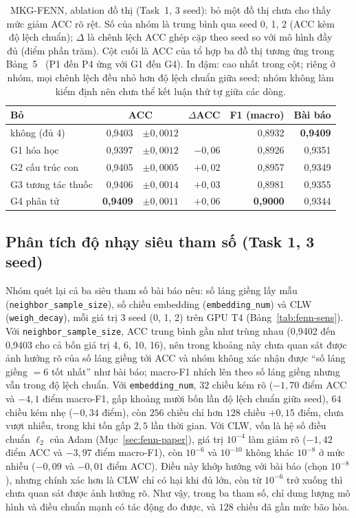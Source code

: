 \documentclass[conference]{IEEEtran}
\newcommand{\hlg}[1]{{\sethlcolor{hlgreen}\hl{#1}}}
\renewcommand{\hl}[1]{#1}
\begin{document}
\begin{table}[t]
\caption{MKG-FENN, ablation đồ thị (Task~1, 3 seed): bỏ một đồ thị \hlg{chưa cho thấy mức giảm ACC rõ rệt}. Số của nhóm là
trung bình qua seed 0, 1, 2 (ACC kèm độ lệch chuẩn); $\Delta$ là chênh lệch ACC ghép cặp theo seed so với
mô hình đầy đủ (điểm phần trăm). Cột cuối là ACC của tổ hợp ba đồ thị tương ứng trong
Bảng~5~\cite{mkgfenn} (P1 đến P4 ứng với G1 đến G4). In đậm: cao nhất trong cột; riêng ở nhóm, mọi chênh lệch
đều nhỏ hơn độ lệch chuẩn giữa seed\hlg{; nhóm không làm kiểm định nên chưa thể kết luận thứ tự giữa các dòng.}}
\label{tab:fenn-abl}
\centering\footnotesize
\setlength{\tabcolsep}{2.3pt}
\begin{tabular}{lr@{\,}lrrr}
\toprule
Bỏ & \multicolumn{2}{c}{ACC} & $\Delta$ACC & F1 (macro) & Bài báo \\
\midrule
không (đủ 4) & 0,9403 & ${\pm}0{,}0012$ & & 0,8932 & \textbf{0,9409} \\
\addlinespace[2pt]
G1 hóa học & 0,9397 & ${\pm}0{,}0012$ & $-0{,}06$ & 0,8926 & 0,9351 \\
G2 cấu trúc con & 0,9405 & ${\pm}0{,}0005$ & $+0{,}02$ & 0,8957 & 0,9349 \\
G3 tương tác thuốc & 0,9406 & ${\pm}0{,}0014$ & $+0{,}03$ & 0,8981 & 0,9355 \\
G4 phân tử & \textbf{0,9409} & ${\pm}0{,}0011$ & $+0{,}06$ & \textbf{0,9000} & 0,9344 \\
\bottomrule
\end{tabular}
\end{table}

\subsection{Phân tích độ nhạy siêu tham số (Task 1, 3 seed)}
Nhóm quét lại cả ba siêu tham số bài báo nêu: số láng giềng lấy mẫu
(\texttt{neighbor\_sample\_size}), số chiều embedding (\texttt{embedding\_num}) và CLW
(\texttt{weigh\_decay}), mỗi giá trị 3 seed (0, 1, 2) trên GPU T4 (Bảng~\ref{tab:fenn-sens}). Với
\texttt{neighbor\_sample\_size}, ACC trung bình gần như trùng nhau (0,9402 đến 0,9403 cho cả bốn giá trị
4, 6, 10, 16), nên trong khoảng này \hlg{chưa quan sát được ảnh hưởng rõ của số láng giềng tới ACC} và nhóm không xác nhận được
``số láng giềng $=6$ tốt nhất'' như bài báo; macro-F1 nhích lên theo số láng giềng nhưng vẫn trong độ
lệch chuẩn. Với \texttt{embedding\_num}, $32$ chiều kém rõ ($-1{,}70$ điểm ACC và $-4{,}1$ điểm
macro-F1, gấp khoảng mười bốn lần độ lệch chuẩn giữa seed), $64$ chiều kém nhẹ ($-0{,}34$ điểm), còn
$256$ chiều chỉ hơn $128$ chiều $+0{,}15$ điểm, chưa vượt nhiễu, trong khi tốn gấp $2{,}5$ lần thời
gian. Với CLW, vốn là hệ số điều chuẩn $\ell_2$ của Adam (Mục~\ref{sec:fenn-paper}), giá trị
$10^{-4}$ làm giảm rõ ($-1{,}42$ điểm ACC và $-3{,}97$ điểm macro-F1), còn $10^{-6}$ và $10^{-10}$
không khác $10^{-8}$ ở mức nhiễu ($-0{,}09$ và $-0{,}01$ điểm ACC). Điều này khớp hướng với bài báo
(chọn $10^{-8}$), nhưng chính xác hơn là CLW chỉ có hại khi đủ lớn, còn từ $10^{-6}$ trở xuống thì
\hlg{chưa quan sát được ảnh hưởng rõ}. Như vậy, trong ba tham số, chỉ dung lượng mô hình và điều chuẩn mạnh có tác động đo
được, và $128$ chiều đã gần mức bão hòa.
\end{document}
